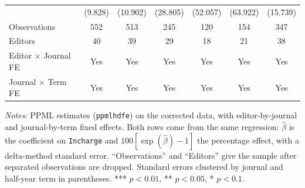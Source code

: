 \begin{table}[!htbp]
\begin{tabular}{lcccccc}
 & (9.828) & (10.902) & (28.805) & (52.057) & (63.922) & (15.739) \\
\quad Observations & 552 & 513 & 245 & 120 & 154 & 347 \\
\quad Editors & 40 & 39 & 29 & 18 & 21 & 38 \\
\midrule
Editor $\times$ Journal FE & Yes & Yes & Yes & Yes & Yes & Yes \\
Journal $\times$ Term FE & Yes & Yes & Yes & Yes & Yes & Yes \\
\bottomrule
\end{tabular}
\begin{minipage}{\linewidth}
\vspace{4pt}
\footnotesize\textit{Notes:} PPML estimates (\texttt{ppmlhdfe}) on the corrected data, with editor-by-journal and journal-by-term fixed effects. Both rows come from the same regression: $\hat\beta$ is the coefficient on \texttt{Incharge} and $100[\exp(\hat\beta)-1]$ the percentage effect, with a delta-method standard error. ``Observations'' and ``Editors'' give the sample after separated observations are dropped. Standard errors clustered by journal and half-year term in parentheses. *** $p<0.01$, ** $p<0.05$, * $p<0.1$.
\end{minipage}
\end{table}
